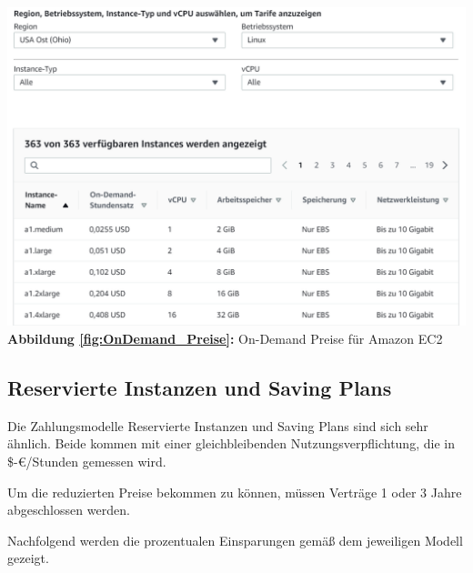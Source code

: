 \begin{center}
    \includegraphics[scale=0.4]{sources/On-Demand-Pläne für Amazon EC2}\label{fig:OnDemand_Preise}\\
    \textbf{Abbildung \autoref{fig:OnDemand_Preise}:} On-Demand Preise für Amazon EC2
        {\cite{AMZ02}}
\end{center}
\subsection{Reservierte Instanzen und Saving Plans}
\begin{flushleft}
    Die Zahlungsmodelle Reservierte Instanzen und Saving Plans sind sich sehr ähnlich. Beide kommen mit einer gleichbleibenden  Nutzungsverpflichtung, die in \$-€/Stunden gemessen wird.

    Um die reduzierten Preise bekommen zu können, müssen Verträge 1 oder 3 Jahre abgeschlossen werden.

    Nachfolgend werden die prozentualen Einsparungen gemäß dem jeweiligen Modell gezeigt.
\end{flushleft}

